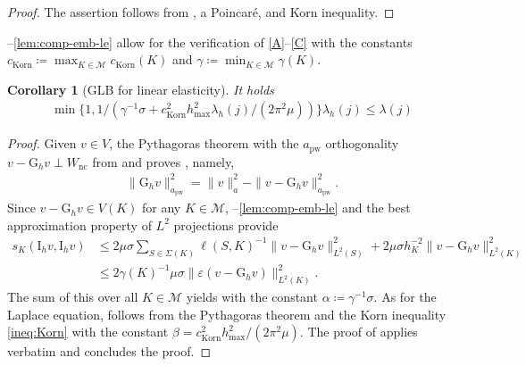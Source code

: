 \documentclass[a4paper]{amsart}
\numberwithin{equation}{section}
\newcommand{\I}{\mathrm{I}}
\newcommand{\Mcal}{\mathcal{M}}
\newcommand{\pw}{\mathrm{pw}}
\newtheorem{corollary}[theorem]{Corollary}
\theoremstyle{remark}
\theoremstyle{definition}
\theoremstyle{assumptionnoperiod}
\begin{document}
\begin{proof}
	The assertion follows from , a Poincar\'e, and Korn inequality.
\end{proof}
--\ref{lem:comp-emb-le} allow for the verification of \ref{A}--\ref{C} with the constants $c_\mathrm{Korn} \coloneqq \max_{K \in \Mcal} c_\mathrm{Korn}(K)$ and $\gamma \coloneqq \min_{K \in \mathcal{M}} \gamma(K)$. 
\begin{corollary}[GLB for linear elasticity]\label{cor:linear-elasticity}
	It holds
	\begin{align*}
		\min\{1,1/(\gamma^{-1}\sigma + c_\mathrm{Korn}^2 h_\mathrm{max}^2\lambda_h(j)/(2\pi^2\mu))\}\lambda_h(j) \leq \lambda(j)
	\end{align*}
\end{corollary}
\begin{proof}
	Given $v \in V$,
	the Pythagoras theorem with the $a_\pw$ orthogonality $v - \mathrm{G}_h v \perp W_\mathrm{nc}$ from  and  proves , namely,
	\begin{align*}
		\|\mathrm{G}_h v\|_{a_\pw}^2 = \|v\|_a^2 - \|v - \mathrm{G}_h v\|_{a_\pw}^2.
	\end{align*}
	Since $v - \mathrm{G}_h v \in V(K)$ for any $K \in \Mcal$, --\ref{lem:comp-emb-le}
	and the best approximation property of $L^2$ projections provide
	\begin{align}\label{ineq:stabilization-le}
		s_K(\I_h v, \I_h v) &\leq 2 \mu \sigma \sum_{S \in \Sigma(K)} \ell(S,K)^{-1}\|v - \mathrm{G}_h v\|^2_{L^2(S)} + 2 \mu \sigma h_K^{-2}\|v - \mathrm{G}_h v\|_{L^2(K)}^2\nonumber\\
		&\leq 2\gamma(K)^{-1}\mu\sigma\|\varepsilon(v - \mathrm{G}_h v)\|^2_{L^2(K)}. 
	\end{align}
	The sum of this over all $K \in \Mcal$ yields 
	 with the constant $\alpha \coloneqq \gamma^{-1}\sigma$.
	As for the Laplace equation,  follows from the Pythagoras theorem and the Korn inequality \eqref{ineq:Korn} with the constant $\beta = c_{\mathrm{Korn}}^2 h_\mathrm{max}^2/(2\pi^2\mu)$. The proof of  applies verbatim and concludes the proof.
\end{proof}
\end{document}
